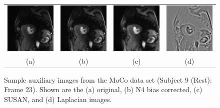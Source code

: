 \documentclass{llncs}
\begin{document}
\begin{figure}
\centering
  \begin{tabular}{cccc}
    \includegraphics[width=29.5mm]{Figures/MoCo_09_Rest_23_Original.png} &
    \includegraphics[width=29.5mm]{Figures/MoCo_09_Rest_23_N4.png} &
    \includegraphics[width=29.5mm]{Figures/MoCo_09_Rest_23_SUSAN.png} &
    \includegraphics[width=29.5mm]{Figures/MoCo_09_Rest_23_Laplacian.png} \\
    (a) & (b) &
    (c) & (d) \\
  \end{tabular}
  \caption{Sample auxiliary images from the MoCo data set (Subject 9 (Rest): Frame 23).
           Shown are the (a) original, (b) N4 bias corrected, (c) SUSAN, and (d) Laplacian
           images.}
  \label{fig:subject9}         
\end{figure}
\end{document}
